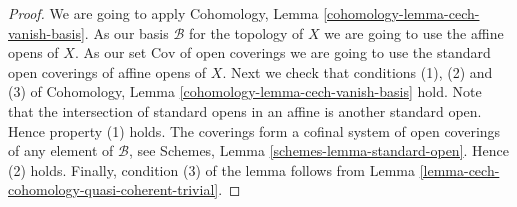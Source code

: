 \documentclass[10pt,a4paper]{amsart}
\theoremstyle{plain}
\theoremstyle{definition}
\theoremstyle{remark}
\numberwithin{equation}{subsection}
\begin{document}
\begin{proof}
We are going to apply
Cohomology, Lemma \ref{cohomology-lemma-cech-vanish-basis}.
As our basis $\mathcal{B}$ for the topology of $X$ we are going to use
the affine opens of $X$.
As our set $\text{Cov}$ of open coverings we are going to use the standard
open coverings of affine opens of $X$.
Next we check that conditions (1), (2) and (3) of
Cohomology, Lemma \ref{cohomology-lemma-cech-vanish-basis}
hold. Note that the intersection of standard opens in an affine is
another standard open. Hence property (1) holds.
The coverings form a cofinal system of open coverings of any element
of $\mathcal{B}$, see
Schemes, Lemma \ref{schemes-lemma-standard-open}.
Hence (2) holds.
Finally, condition (3) of the lemma follows from
Lemma \ref{lemma-cech-cohomology-quasi-coherent-trivial}.
\end{proof}
\end{document}
